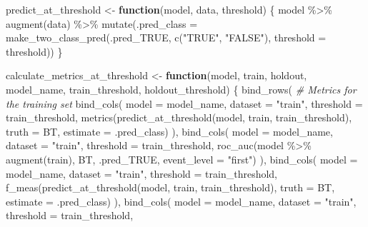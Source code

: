 \documentclass[
]{article}
\newenvironment{Shaded}{\begin{snugshade}}{\end{snugshade}}
\newcommand{\AttributeTok}[1]{\textcolor[rgb]{0.77,0.63,0.00}{#1}}
\newcommand{\CommentTok}[1]{\textcolor[rgb]{0.56,0.35,0.01}{\textit{#1}}}
\newcommand{\ControlFlowTok}[1]{\textcolor[rgb]{0.13,0.29,0.53}{\textbf{#1}}}
\newcommand{\FunctionTok}[1]{\textcolor[rgb]{0.00,0.00,0.00}{#1}}
\newcommand{\NormalTok}[1]{#1}
\newcommand{\OtherTok}[1]{\textcolor[rgb]{0.56,0.35,0.01}{#1}}
\newcommand{\SpecialCharTok}[1]{\textcolor[rgb]{0.00,0.00,0.00}{#1}}
\newcommand{\StringTok}[1]{\textcolor[rgb]{0.31,0.60,0.02}{#1}}
\begin{document}
\begin{Shaded}
\begin{Highlighting}[]
\NormalTok{predict\_at\_threshold }\OtherTok{\textless{}{-}} \ControlFlowTok{function}\NormalTok{(model, data, threshold) \{}
\NormalTok{  model }\SpecialCharTok{\%\textgreater{}\%}
    \FunctionTok{augment}\NormalTok{(data) }\SpecialCharTok{\%\textgreater{}\%}
    \FunctionTok{mutate}\NormalTok{(}\AttributeTok{.pred\_class =} \FunctionTok{make\_two\_class\_pred}\NormalTok{(.pred\_TRUE,}
                     \FunctionTok{c}\NormalTok{(}\StringTok{"TRUE"}\NormalTok{, }\StringTok{"FALSE"}\NormalTok{),}
                     \AttributeTok{threshold =}\NormalTok{ threshold))}
\NormalTok{\}}

\NormalTok{calculate\_metrics\_at\_threshold }\OtherTok{\textless{}{-}} \ControlFlowTok{function}\NormalTok{(model, train, holdout, model\_name, train\_threshold, holdout\_threshold) \{}
  \FunctionTok{bind\_rows}\NormalTok{(}
    \CommentTok{\# Metrics for the training set}
    \FunctionTok{bind\_cols}\NormalTok{(}
      \AttributeTok{model =}\NormalTok{ model\_name,}
      \AttributeTok{dataset =} \StringTok{"train"}\NormalTok{,}
      \AttributeTok{threshold =}\NormalTok{ train\_threshold,}
      \FunctionTok{metrics}\NormalTok{(}\FunctionTok{predict\_at\_threshold}\NormalTok{(model, train, train\_threshold), }\AttributeTok{truth =}\NormalTok{ BT, }\AttributeTok{estimate =}\NormalTok{ .pred\_class)}
\NormalTok{    ),}
    \FunctionTok{bind\_cols}\NormalTok{(}
      \AttributeTok{model =}\NormalTok{ model\_name,}
      \AttributeTok{dataset =} \StringTok{"train"}\NormalTok{,}
      \AttributeTok{threshold =}\NormalTok{ train\_threshold,}
      \FunctionTok{roc\_auc}\NormalTok{(model }\SpecialCharTok{\%\textgreater{}\%} \FunctionTok{augment}\NormalTok{(train), BT, .pred\_TRUE, }\AttributeTok{event\_level =} \StringTok{"first"}\NormalTok{)}
\NormalTok{    ),}
    \FunctionTok{bind\_cols}\NormalTok{(}
      \AttributeTok{model =}\NormalTok{ model\_name,}
      \AttributeTok{dataset =} \StringTok{"train"}\NormalTok{,}
      \AttributeTok{threshold =}\NormalTok{ train\_threshold,}
      \FunctionTok{f\_meas}\NormalTok{(}\FunctionTok{predict\_at\_threshold}\NormalTok{(model, train, train\_threshold), }\AttributeTok{truth =}\NormalTok{ BT, }\AttributeTok{estimate =}\NormalTok{ .pred\_class)}
\NormalTok{    ),}
    \FunctionTok{bind\_cols}\NormalTok{(}
      \AttributeTok{model =}\NormalTok{ model\_name,}
      \AttributeTok{dataset =} \StringTok{"train"}\NormalTok{,}
      \AttributeTok{threshold =}\NormalTok{ train\_threshold,}

\end{Highlighting}
\end{Shaded}
\end{document}

